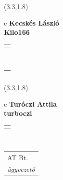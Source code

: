 \documentclass[11pt]{article}
\begin{document}
\makebox(3.3,1.8){
  \renewcommand\arraystretch{1.3}
  \begin{tabular}[c]{c}
    \hspace{8.5mm}
    \LARGE\bf{ Kecskés László }\\
    \hspace{8.5mm}
    \Large{ Kilo166 }\\
    \renewcommand\arraystretch{3}
    \begin{tabular}[c]{c}
      \centering
      \fontfamily{phv}\selectfont{
        \textbf{
          \textsc{
            \scriptsize{
            \color{Dark}{ Ismerkedő }\color{Bright}{ Webmester }\color{Bright}{ Sminkmester }\color{Bright}{ Programozó }
            }
          }
        }
      }
    \end{tabular}
    \\
    \renewcommand\arraystretch{1}
    \begin{tabular}{p{3.3in}}
      \hspace{.7cm}\\
      \hspace{.7cm}\emph{  }\\
    \end{tabular}
  \end{tabular}
}

\makebox(3.3,1.8){
  \renewcommand\arraystretch{1.3}
  \begin{tabular}[c]{c}
    \hspace{8.5mm}
    \LARGE\bf{ Turóczi Attila }\\
    \hspace{8.5mm}
    \Large{ turboczi }\\
    \renewcommand\arraystretch{3}
    \begin{tabular}[c]{c}
      \centering
      \fontfamily{phv}\selectfont{
        \textbf{
          \textsc{
            \scriptsize{
            \color{Bright}{ Ismerkedő }\color{Dark}{ Webmester }\color{Bright}{ Sminkmester }\color{Bright}{ Programozó }
            }
          }
        }
      }
    \end{tabular}
    \\
    \renewcommand\arraystretch{1}
    \begin{tabular}{p{3.3in}}
      \hspace{.7cm}AT Bt.\\
      \hspace{.7cm}\emph{ ügyvezető }\\
    \end{tabular}
  \end{tabular}
}
\end{document}
